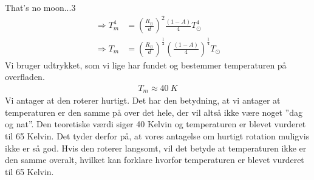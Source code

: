 \begin{opgave}{That's no moon...}{3}
\begin{align*}
 \Rightarrow T_m^4 &= \left( \frac{R_\odot}{d} \right) ^2 \frac{\left( 1-A\right)}{4} T_\odot^4\\ 
 \Rightarrow T_m &= \left( \frac{R_\odot}{d} \right) ^{\frac{1}{2}} \left( \frac{\left( 1-A \right) }{4} \right) ^{\frac{1}{4}} T_\odot
 \end{align*}
 \opg Vi bruger udtrykket, som vi lige har fundet og bestemmer temperaturen på overfladen. 
 \begin{align*}
 T_m \approx 40~\si{K}
 \end{align*}
 Vi antager at den roterer hurtigt. Det har den betydning, at vi antager at temperaturen er den samme på over det hele, der vil altså ikke være noget ''dag og nat''. Den teoretiske værdi siger 40 Kelvin og temperaturen er blevet vurderet til 65 Kelvin. Det tyder derfor på, at vores antagelse om hurtigt rotation muligvis ikke er så god. Hvis den roterer langsomt, vil det betyde at temperaturen ikke er den samme overalt, hvilket kan forklare hvorfor temperaturen er blevet vurderet til 65 Kelvin. 
\end{opgave}


